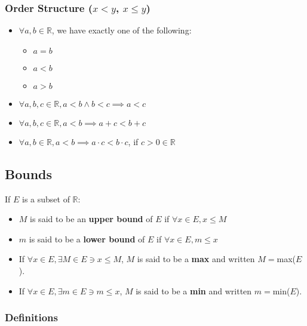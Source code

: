 \documentclass{article}
\theoremstyle{break}
\begin{document}
\subsubsection{Order Structure ($x < y$, $x \le y$)}
\begin{itemize}
\item $\forall a, b \in \mathbb{R}$, we have exactly one of the following:
  \begin{itemize}
  \item $a = b$
  \item $a < b$
  \item $a > b$
  \end{itemize}
\item $\forall a, b, c \in \mathbb{R}, a < b \land b < c \implies a < c$
\item $\forall a, b, c \in \mathbb{R}, a < b \implies a + c < b + c$
\item $\forall a, b \in \mathbb{R}, a < b \implies a \cdot c < b \cdot c$, if $c
  > 0 \in \mathbb{R}$
\end{itemize}

\subsection{Bounds}
If $E$ is a subset of $\mathbb{R}$:

\begin{itemize}
\item $M$ is said to be an \textbf{upper bound} of $E$ if $\forall x \in E, x
  \le M$
\item $m$ is said to be a \textbf{lower bound} of $E$ if $\forall x \in E, m \le
  x$
\item If $\forall x \in E, \exists M \in E \ni x \le M$, $M$ is said to be a
  \textbf{max} and written $M = $max($E$).
\item If $\forall x \in E, \exists m \in E \ni m \le x$, $M$ is said to be a
  \textbf{min} and written $m = $min($E$).
\end{itemize}

\subsubsection{Definitions}
\end{document}

